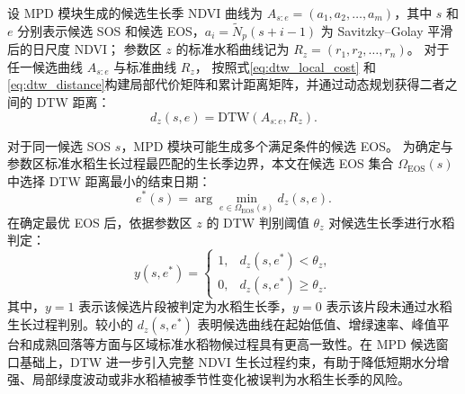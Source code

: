 设 MPD 模块生成的候选生长季 NDVI 曲线为 \(A_{s:e}=(a_1,a_2,\ldots,a_m)\)，其中 \(s\) 和 \(e\) 分别表示候选 SOS 和候选 EOS，\(a_i=\widetilde{N}_p(s+i-1)\) 为 Savitzky--Golay 平滑后的日尺度 NDVI；
参数区 \(z\) 的标准水稻曲线记为 \(R_z=(r_1,r_2,\ldots,r_n)\)。
对于任一候选曲线 \(A_{s:e}\) 与标准曲线 \(R_z\)，
按照式\ref{eq:dtw_local_cost} 和 \ref{eq:dtw_distance}构建局部代价矩阵和累计距离矩阵，并通过动态规划获得二者之间的 DTW 距离：
\[
    d_z(s,e)=\mathrm{DTW}(A_{s:e},R_z).
\]



对于同一候选 SOS \(s\)，MPD 模块可能生成多个满足条件的候选 EOS。
为确定与参数区标准水稻生长过程最匹配的生长季边界，本文在候选 EOS 集合
\(\Omega_{\mathrm{EOS}}(s)\) 中选择 DTW 距离最小的结束日期：
\begin{equation}
    e^{*}(s)=\arg\min_{e\in\Omega_{\mathrm{EOS}}(s)} d_z(s,e).
    \label{eq:best_eos}
\end{equation}
在确定最优 EOS 后，依据参数区 \(z\) 的 DTW 判别阈值 \(\theta_z\) 对候选生长季进行水稻判定：
\begin{equation}
    y(s,e^{*})=
    \left\{
    \begin{array}{ll}
        1, & d_z(s,e^{*})<\theta_z,\\
        0, & d_z(s,e^{*})\geq\theta_z.
    \end{array}
    \right.
    \label{eq:dtw_threshold}
\end{equation}
其中，\(y=1\) 表示该候选片段被判定为水稻生长季，\(y=0\) 表示该片段未通过水稻生长过程判别。较小的 \(d_z(s,e^{*})\) 表明候选曲线在起始低值、增绿速率、峰值平台和成熟回落等方面与区域标准水稻物候过程具有更高一致性。在 MPD 候选窗口基础上，DTW 进一步引入完整 NDVI 生长过程约束，有助于降低短期水分增强、局部绿度波动或非水稻植被季节性变化被误判为水稻生长季的风险。

